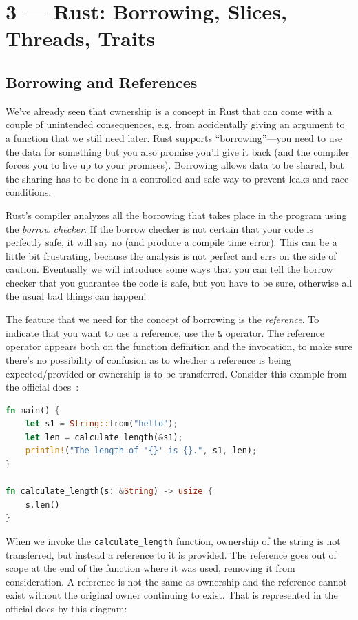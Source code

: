 \documentclass[a4paper]{report}
\begin{document}
\chapter*{3 --- Rust: Borrowing, Slices, Threads, Traits}


\section*{Borrowing and References}
We've already seen that ownership is a concept in Rust that can come with a couple of unintended consequences, e.g. from accidentally giving an argument to a function that we still need later. Rust supports ``borrowing''---you need to use the data for something but you also promise you'll give it back (and the compiler forces you to live up to your promises). Borrowing allows data to be shared, but the sharing has to be done in a controlled and safe way to prevent leaks and race conditions.

Rust's compiler analyzes all the borrowing that takes place in the program using the \textit{borrow checker}. If the borrow checker is not certain that your code is perfectly safe, it will say no (and produce a compile time error). This can be a little bit frustrating, because the analysis is not perfect and errs on the side of caution. Eventually we will introduce some ways that you can tell the borrow checker that you guarantee the code is safe, but you have to be sure, otherwise all the usual bad things can happen!

The feature that we need for the concept of borrowing is the \textit{reference}. To indicate that you want to use a reference, use the \texttt{\&} operator. The reference operator appears both on the function definition and the invocation, to make sure there's no possibility of confusion as to whether a reference is being expected/provided or ownership is to be transferred.  Consider this example from the official docs~\cite{rustdocs}:

\begin{lstlisting}[language=Rust]
fn main() {
    let s1 = String::from("hello");
    let len = calculate_length(&s1);
    println!("The length of '{}' is {}.", s1, len);
}

fn calculate_length(s: &String) -> usize {
    s.len()
}
\end{lstlisting}

When we invoke the \texttt{calculate\_length} function, ownership of the string is not transferred, but instead a reference to it is provided. The reference goes out of scope at the end of the function where it was used, removing it from consideration. A reference is not the same as ownership and the reference cannot exist without the original owner continuing to exist. That is represented in the official docs by this diagram:
\end{document}
